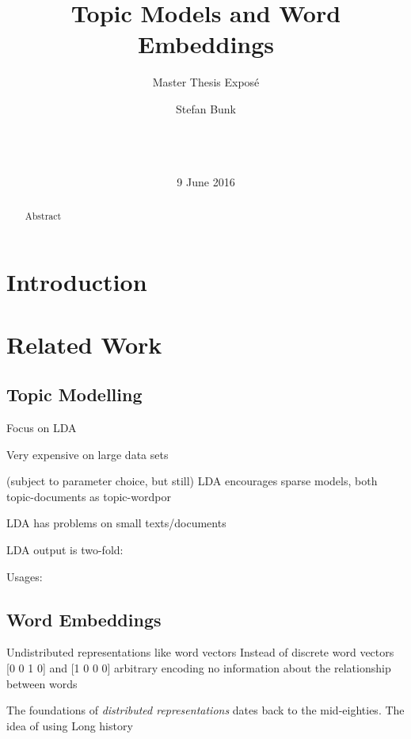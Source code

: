 \documentclass{sig-alternate-05-2015}
\begin{document}

\title{Topic Models and Word Embeddings}
\subtitle{Master Thesis Expos\'e}

\author{
\alignauthor
Stefan Bunk\\
       \\
       \\
       \\
}
\date{9 June 2016}

\maketitle
\begin{abstract}
Abstract
\end{abstract}

\section{Introduction}
\section{Related Work}
\subsection{Topic Modelling}
Focus on LDA

Very expensive on large data sets

(subject to parameter choice, but still) LDA encourages sparse models, both topic-documents as topic-wordpor

LDA has problems on small texts/documents

LDA output is two-fold:

Usages:

\subsection{Word Embeddings}
Undistributed representations like word vectors
Instead of discrete word vectors 
[0 0 1 0] and [1 0 0 0]
arbitrary encoding
no information about the relationship between words

The foundations of \emph{distributed representations} dates back to the mid-eighties\cite{Hinton1986,Rumelhart1988}.
The idea of using 
Long history
\end{document}
